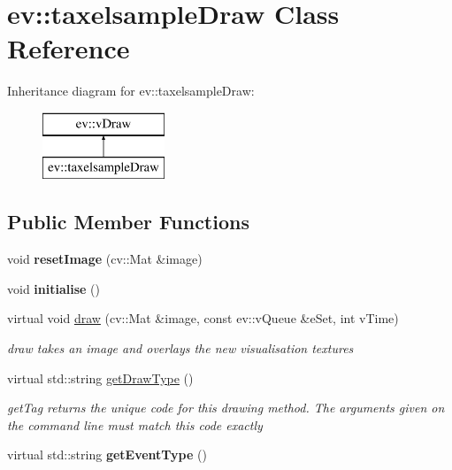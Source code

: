 \hypertarget{classev_1_1taxelsampleDraw}{}\section{ev\+:\+:taxelsample\+Draw Class Reference}
\label{classev_1_1taxelsampleDraw}
Inheritance diagram for ev\+:\+:taxelsample\+Draw\+:\begin{figure}[H]
\begin{center}
\leavevmode
\includegraphics[height=2.000000cm]{classev_1_1taxelsampleDraw}
\end{center}
\end{figure}
\subsection*{Public Member Functions}
\begin{DoxyCompactItemize}
\item 
\mbox{\label{classev_1_1taxelsampleDraw_ae3b414d9cc7894b504683f0af8059d89}} 
void {\bfseries reset\+Image} (cv\+::\+Mat \&image)
\item 
\mbox{\label{classev_1_1taxelsampleDraw_a9d69dcd342df4005f86966f18b8b31c4}} 
void {\bfseries initialise} ()
\item 
virtual void \hyperlink{classev_1_1taxelsampleDraw_a43e40e8cfc4ed342f8d616eb9ddecf0a}{draw} (cv\+::\+Mat \&image, const ev\+::v\+Queue \&e\+Set, int v\+Time)
\begin{DoxyCompactList}\small\item\em draw takes an image and overlays the new visualisation textures \end{DoxyCompactList}\item 
virtual std\+::string \hyperlink{classev_1_1taxelsampleDraw_a7bf19e7de1e4851b5567308e95334942}{get\+Draw\+Type} ()
\begin{DoxyCompactList}\small\item\em get\+Tag returns the unique code for this drawing method. The arguments given on the command line must match this code exactly \end{DoxyCompactList}\item 
\mbox{\label{classev_1_1taxelsampleDraw_ac02cc2de0555b249d6a0df31f7954140}} 
virtual std\+::string {\bfseries get\+Event\+Type} ()
\end{DoxyCompactItemize}
